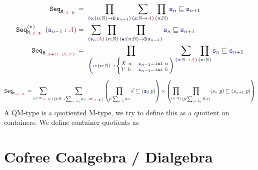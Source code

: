 \documentclass[twoside,11pt,openright]{report}
\theoremstyle{plain} %
\theoremstyle{definition}
\theoremstyle{remark}
\newcommand*{\term}[1]{\textcolor{green!30!black}{#1}} %
\newcommand*{\type}[1]{\textcolor{magenta!90!black}{#1}}
\newcommand*{\containerpair}[2]{\ensuremath{\colorlet{savedleftcolor}{.}\color{orange}\left(\color{savedleftcolor}#1\,\textcolor{orange}{\mathbf{,}}\,#2\color{orange}\right)\color{savedleftcolor}}}
\newcommand*{\function}[1]{\textcolor{blue!60!black}{\ensuremath{\mathtt{#1}}}}
\newcommand*{\typeformer}[1]{\ensuremath{\mathtt{#1}}}
\begin{document}
\begin{align}
  \typeformer{Seq}_{\typeformer{M}_{\containerpair{\type{A}}{\typeformer{B}}}} &=~\prod_{(\function{e} : (n : \mathbb{N}) \rightarrow \typeformer{B}\,\function{s}_{n-1})}\sum_{(\function{s} : \mathbb{N} \rightarrow \type{A})}\prod_{(n : \mathbb{N})} \function{s}_n \sqsubseteq \function{s}_{n+1} \\
  \typeformer{Seq}_{\typeformer{M}_{\containerpair{\type{A}}{\typeformer{B}}}}^{(n)}~(\function{s}_{n-1} : \type{A}) &=~\sum_{(\function{s}_n : \type{A})} \prod_{(n : \mathbb{N})} \prod_{(\function{e} : (n : \mathbb{N}) \rightarrow \typeformer{B}\,\function{s}_{n-1})} \function{s}_n \sqsubseteq \function{s}_{n+1} \\
  \typeformer{Seq}_{\typeformer{M}_{\containerpair{\type{A} + \type{B}}{[\type{X} , \type{Y}]}}} &=~\prod_{\left(\function{e} : (n : \mathbb{N}) \rightarrow {\begin{cases}  {\scriptstyle  X~a} & {\scriptstyle  \function{s}_{n-1} = \mathtt{inl}~a} \\[-2mm] {\scriptstyle  Y~b} & {\scriptstyle  \function{s}_{n-1} = \mathtt{inr}~b} \end{cases}}\right)}\sum_{(\function{s} : \mathbb{N} \rightarrow \type{A})}\prod_{(n : \mathbb{N})} \function{s}_n \sqsubseteq \function{s}_{n+1}
\end{align}
\begin{equation}
  \typeformer{Seq}_{\typeformer{M}_{\containerpair{\type{A}}{\type{B}}}} = \sum_{(\term{s'} : \typeformer{M}_{\containerpair{\type{A}}{\typeformer{B}}})}  \sum_{(\function{s} : \mathbb{N} \rightarrow \sum_{(\term{a} : \type{A})} \typeformer{B}\,\term{a} \rightarrow \typeformer{M}_{\containerpair{\type{A}}{\typeformer{B}}})} \left(\prod_{\term{p} : \sum_{\term{a} : \type{A}} \typeformer{B}\,\term{a}} \term{s'} \sqsubseteq (\function{s}_0~\term{p})\right) \times \left( \prod_{(n : \mathbb{N})} \prod_{(p : \sum_{(a : A)} B\,a)} (s_n~p) \sqsubseteq (s_{n+1}~p) \right)
\end{equation}
A QM-type is a quotiented M-type, we try to define this as a quotient on containers. We define container quotients as

\section{Cofree Coalgebra / Dialgebra}

\end{document}
